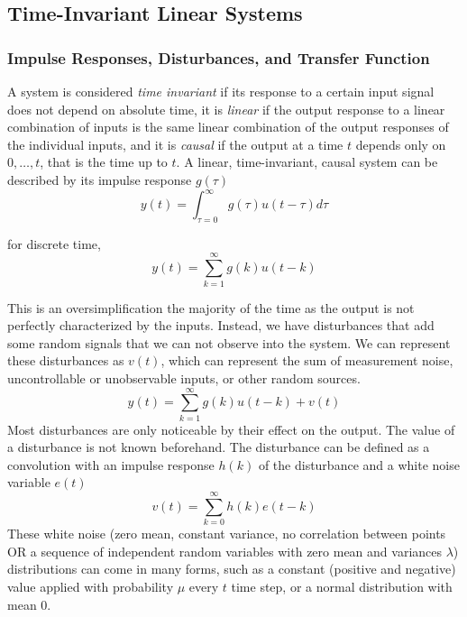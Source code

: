 \subsection{Time-Invariant Linear Systems}
\subsubsection{Impulse Responses, Disturbances, and Transfer Function}
A system is considered \textit{time invariant} if its response to a certain input signal does not depend on absolute time, it is \textit{linear} if the output response to a linear combination of inputs is the same linear combination of the output responses of the individual inputs, and it is \textit{causal} if the output at a time $t$ depends only on $0,\dots,t$, that is the time up to $t$.
A linear, time-invariant, causal system can be described by its impulse response $g(\tau)$
\begin{equation}
    y(t) = \int_{\tau=0}^{\infty} g(\tau) u(t-\tau) d \tau
\end{equation}

for discrete time,
\begin{equation}
    y(t) = \sum_{k=1}^{\infty} g(k) u(t-k)
\end{equation}

This is an oversimplification the majority of the time as the output is not perfectly characterized by the inputs.
Instead, we have disturbances that add some random signals that we can not observe into the system.
We can represent these disturbances as $v(t)$, which can represent the sum of measurement noise, uncontrollable or unobservable inputs, or other random sources.
\begin{equation}
    y(t) = \sum_{k=1}^{\infty} g(k) u(t-k) + v(t)
\end{equation}
Most disturbances are only noticeable by their effect on the output.
The value of a disturbance is not known beforehand.
The disturbance can be defined as a convolution with an impulse response $h(k)$ of the disturbance and a white noise variable $e(t)$
\begin{equation}
    v(t) = \sum_{k=0}^{\infty} h(k) e(t-k)
\end{equation}
These white noise (zero mean, constant variance, no correlation between points OR a sequence of independent random variables with zero mean and variances $\lambda$) distributions can come in many forms, such as a constant (positive and negative) value applied with probability $\mu$ every $t$ time step, or a normal distribution with mean $0$. 

